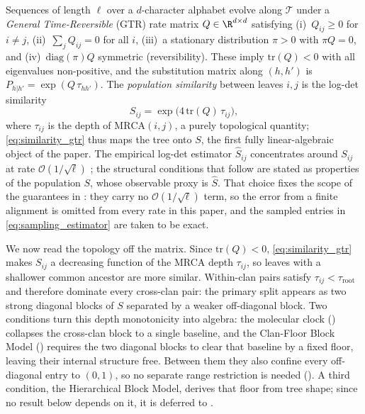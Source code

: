\begin{assumption}\label{asm:gtr}
Sequences of length $\ell$ over a $d$-character alphabet evolve along $\mathcal{T}$
under a \emph{General Time-Reversible} (GTR) rate matrix $Q \in \R^{d \times d}$
satisfying (i)~$Q_{ij}\ge0$ for $i\ne j$, (ii)~$\sum_j Q_{ij}=0$ for all $i$,
(iii)~a stationary distribution $\pi>0$ with $\pi Q=0$, and (iv)~$\mathrm{diag}(\pi)Q$
symmetric (reversibility). These imply $\mathrm{tr}(Q)<0$ with all eigenvalues
non-positive, and the substitution matrix along $(h,h')$ is
$P_{h|h'}=\exp(Q\,\tau_{hh'})$. The \emph{population similarity} between leaves
$i,j$ is the log-det similarity \cite{aizenbud2023spectral}
\begin{equation}\label{eq:similarity_gtr}
    S_{ij} = \exp\!\bigl(4\,\mathrm{tr}(Q)\,\tau_{ij}\bigr),
\end{equation}
where $\tau_{ij}$ is the depth of $\mathrm{MRCA}(i,j)$, a purely topological
quantity; \eqref{eq:similarity_gtr} thus maps the tree onto $S$, the first fully
linear-algebraic object of the paper. The empirical log-det estimator
$\hat S_{ij}$ concentrates around $S_{ij}$ at rate $\mathcal O(1/\sqrt\ell)$
\cite{aizenbud2023spectral}; the structural conditions that follow are stated
as properties of the population $S$, whose observable proxy is $\hat S$. That
choice fixes the scope of the guarantees in : they carry no
$\mathcal O(1/\sqrt\ell)$ term, so the error from a finite alignment is omitted
from every rate in this paper, and the sampled entries in
\eqref{eq:sampling_estimator} are taken to be exact.
\end{assumption}

We now read the topology off the matrix. Since $\mathrm{tr}(Q)<0$,
\eqref{eq:similarity_gtr} makes $S_{ij}$ a decreasing function of the MRCA depth
$\tau_{ij}$, so leaves with a shallower common ancestor are more similar.
Within-clan pairs satisfy $\tau_{ij}<\tau_{\mathrm{root}}$ and therefore dominate
every cross-clan pair: the primary split appears as two strong diagonal blocks of
$S$ separated by a weaker off-diagonal block. Two conditions turn this depth
monotonicity into algebra: the molecular clock () collapses the
cross-clan block to a single baseline, and the Clan-Floor Block Model
() requires the two diagonal blocks to clear that baseline by a
fixed floor, leaving their internal structure free. Between them they also confine
every off-diagonal entry to $(0,1)$, so no separate range restriction is needed
(). A third condition, the
Hierarchical Block Model, derives that floor from tree shape; since no result
below depends on it, it is deferred to .

